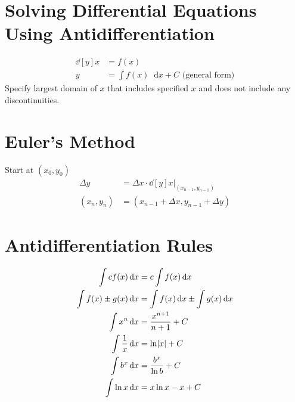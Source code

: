 \documentclass[12pt]{article}
\DeclarePairedDelimiter\abs{\lvert}{\rvert}
\newcommand*{\D}[1]{\mathop{}\!\mathrm{d}#1}
\newcommand*{\fixmath}{%
  \makebox{}\vspace{\glueexpr-\baselineskip-\abovedisplayskip}}
\newenvironment{fixaskip}{\setlength{\abovedisplayskip}{0pt}\fixmath%
  \ignorespaces}{\ignorespacesafterend}
\newenvironment{fixbskip}{\setlength{\belowdisplayskip}{0pt}\ignorespaces}%
  {\ignorespacesafterend}
\newenvironment{fixskip}{\setlength{\abovedisplayskip}{0pt}%
  \setlength{\belowdisplayskip}{0pt}\fixmath\ignorespaces}%
  {\ignorespacesafterend}
\begin{document}
\section*{Solving Differential Equations Using Antidifferentiation}
\begin{fixaskip}
  \begin{align*}
    \dd[y]{x} &= f(x)\\
    y &= \int f(x) \D{x} + C \text{ (general form)}
  \end{align*}
\end{fixaskip}
Specify largest domain of \(x\) that includes specified \(x\) and does not
include any discontinuities.
\section*{Euler's Method}
Start at \((x_0,y_0)\)
\begin{fixbskip}
  \begin{align*}
    \Delta y &= \Delta x \cdot \dd[y]{x} \bigg|_{(x_{n-1},y_{n-1})}\\
    (x_n,y_n) &= (x_{n-1} + \Delta x, y_{n-1} + \Delta y)
  \end{align*}
\end{fixbskip}
\section*{Antidifferentiation Rules}
\begin{fixskip}
  \begin{align*}
    \int cf(x) \D{x} &= c \int f(x) \D{x}\\
    \int f(x) \pm g(x) \D{x} &= \int f(x) \D{x} \pm \int g(x) \D{x}\\
    \int x^n \D{x} &= \frac{x^{n+1}}{n+1} + C\\
    \int \frac{1}{x} \D{x} &= \ln\abs*{x} + C\\
    \int b^x \D{x} &= \frac{b^x}{\ln b} + C\\
    \int \ln x \D{x} &= x\ln x - x + C
  \end{align*}
\end{fixskip}
\end{document}
